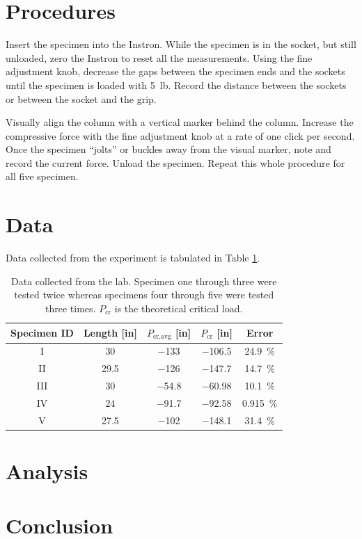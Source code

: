 \documentclass[12 pt]{article}
\begin{document}
\section{Procedures} \label{procedures}
Insert the specimen into the Instron. While the specimen is in the socket, but still unloaded, zero the Instron to reset all the measurements. Using the fine adjustment knob, decrease the gaps between the specimen ends and the sockets until the specimen is loaded with \qty{5}{lb}. Record the distance between the sockets or between the socket and the grip.

Visually align the column with a vertical marker behind the column. Increase the compressive force with the fine adjustment knob at a rate of one click per second. Once the specimen ``jolts'' or buckles away from the visual marker, note and record the current force. Unload the specimen. Repeat this whole procedure for all five specimen.

\section{Data} \label{data}
Data collected from the experiment is tabulated in Table \ref{tbl:data}.

\begin{table}[!htbp]
\caption{Data collected from the lab. Specimen one through three were tested twice whereas specimens four through five were tested three times. $P_\text{cr}$ is the theoretical critical load.}
\begin{center}
	\begin{tabular}{|c|c|c|c|c|}
		\hline
		Specimen ID&Length [\unit{in}]&$P_\text{cr,avg}$ [\unit{in}]&$P_\text{cr}$ [\unit{in}]&Error\\
		\hline
		I&\num{30}&\num{-133}&\num{-106.5}&\qty{24.9}{\percent}\\
		\hline
		II&\num{29.5}&\num{-126}&\num{-147.7}&\qty{14.7}{\percent}\\
		\hline
		III&\num{30}&\num{-54.8}&\num{-60.98}&\qty{10.1}{\percent}\\
		\hline
		IV&\num{24}&\num{-91.7}&\num{-92.58}&\qty{0.915}{\percent}\\
		\hline
		V&\num{27.5}&\num{-102}&\num{-148.1}&\qty{31.4}{\percent}\\
		\hline
	\end{tabular}
\end{center}
\label{tbl:data}
\end{table}

\section{Analysis} \label{analysis}

\section{Conclusion} \label{conclusion}
\end{document}
